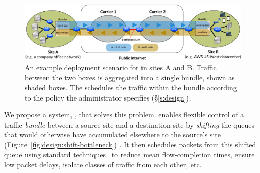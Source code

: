 
\begin{figure}[ht!]
    \centering
    \includegraphics[width=\textwidth]{img/deployment-arch.pdf}
    \caption{An example deployment scenario for \name in sites A and B.
    Traffic between the two boxes is aggregated into a single bundle, shown as shaded boxes. The \inbox schedules the traffic within the bundle according to the policy the administrator specifies (\S\ref{s:design}).
    }
    \label{fig:deploy:arch}
\end{figure}


We propose a system, {\em \name}, that solves this problem. \name enables flexible control of a traffic {\em bundle} between a source site and a destination site by {\em shifting} the queues that would otherwise have accumulated elsewhere to the source's site (Figure~\ref{fig:design:shift-bottleneck}) . It then schedules packets from this shifted queue using standard techniques~\cite{diffserv, fair-queueing, sfq, pie, CoDel, fifoplus, virtualClocks, csfq, drr, red, ecn} to reduce mean flow-completion times, ensure low packet delays, isolate classes of traffic from each other, etc.



